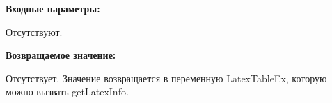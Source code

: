 \textbf{Входные параметры:}

Отсутствуют.

\textbf{Возвращаемое значение:}

Отсутствует. Значение возвращается в переменную LatexTableEx, которую можно вызвать getLatexInfo.
